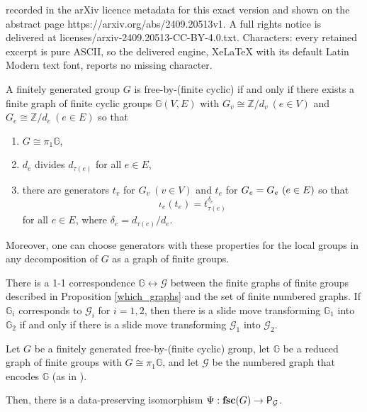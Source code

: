 \documentclass[10pt,a4paper]{amsart}
\def\GG{\mathbb{G}}
\def\Z{\mathbb Z}
\def\mc{\mathcal}
\def\tsc{{\rm{\bf{fsc}}}}
\def\t{\tau}
\begin{document}
recorded in the arXiv licence metadata for this exact version and shown on the abstract page https://arxiv.org/abs/2409.20513v1. A full rights notice is delivered at licenses/arxiv-2409.20513-CC-BY-4.0.txt. Characters: every retained excerpt is pure ASCII, so the delivered engine, XeLaTeX with its default Latin Modern text font, reports no missing character.
\begin{proposition}
\label{which_graphs} 
	A finitely generated group $G$ is free-by-(finite cyclic)
	if and only if there exists 
	a finite graph of finite cyclic groups $\GG(V,E)$ with 
	$G_v\cong \Z/d_v\ (e\in V)$ and 
	$G_e\cong \Z/d_e\ (e\in E)$ so that 
	\begin{enumerate}
		\item $G\cong\pi_1\GG$,
		\item $d_e$ divides $d_{\tau(e)}$ for all $e\in E$,
		\item there are generators $t_v$ for $G_v\ (v\in V)$ 
		and $t_e$ for $G_e=G_{\-e}\ (e\in E)$ so that 
		$$\iota_e(t_e) = t_{\t(e)}^{\delta_e}$$ 
		for all $e\in E$, where $\delta_e = d_{\tau(e)}/d_e$. 
	\end{enumerate} 
	Moreover, one can choose generators with these properties 
	for the local groups in any decomposition of $G$ 
	as a graph of finite groups. 
\end{proposition}

\begin{lemma}\label{l:sliding-the-same}
	There is a 1-1 correspondence  $\GG \leftrightarrow \mc{G}$
	between the finite graphs of finite groups described in Proposition \ref{which_graphs} and
	the set of finite numbered graphs. If $\GG_i$ corresponds to $\mc{G}_i$ for $i=1,2$, then
	there is a slide move transforming $\GG_1$ into $\GG_2$ if and only if there is a slide move
	transforming $\mc{G}_1$ into $\mc{G}_2$.
\end{lemma}

\begin{proposition}
\label{associated_poset_is_torsion_subgroups}
	Let $G$ be a finitely generated free-by-(finite cyclic) group, 
	let $\GG$ be a reduced graph of finite groups 
	with $G\cong \pi_1\GG$, 
	and let $\mc{G}$ be the numbered graph that encodes $\GG$ 
	(as in ).  
	
	Then, there is a data-preserving isomorphism 
	$\Psi: \tsc(G)\to \mathsf{P}_\mathcal{G}$. 
\end{proposition}
\end{document}
